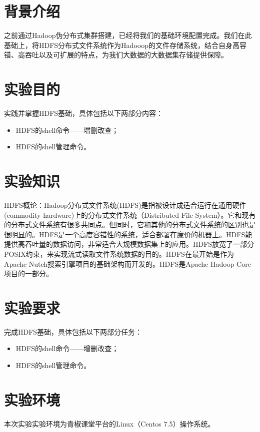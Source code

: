 \documentclass {article}
\begin{document}
	\maketitle{}
	\section{背景介绍}
		之前通过Hadoop伪分布式集群搭建，已经将我们的基础环境配置完成。我们在此基础上，将HDFS分布式文件系统作为Hadooop的文件存储系统，结合自身高容错、高吞吐以及可扩展的特点，为我们大数据的大数据集存储提供保障。
	
	\section{实验目的}
		实践并掌握HDFS基础，具体包括以下两部分内容：
		\begin{itemize}
			\item HDFS的shell命令——增删改查；
			\item HDFS的shell管理命令。
		\end{itemize}
	
	\section{实验知识}	
		HDFS概论：Hadoop分布式文件系统(HDFS)是指被设计成适合运行在通用硬件(commodity hardware)上的分布式文件系统（Distributed File System）。它和现有的分布式文件系统有很多共同点。但同时，它和其他的分布式文件系统的区别也是很明显的。HDFS是一个高度容错性的系统，适合部署在廉价的机器上。HDFS能提供高吞吐量的数据访问，非常适合大规模数据集上的应用。HDFS放宽了一部分POSIX约束，来实现流式读取文件系统数据的目的。HDFS在最开始是作为Apache Nutch搜索引擎项目的基础架构而开发的。HDFS是Apache Hadoop Core项目的一部分。
	
	\section{实验要求}
		完成HDFS基础，具体包括以下两部分任务：
		\begin{itemize}
			\item HDFS的shell命令——增删改查；
			\item HDFS的shell管理命令。
		\end{itemize}
	
	\section{实验环境}
		本次实验实验环境为青椒课堂平台的Linux（Centos 7.5）操作系统。
	
\end{document}
